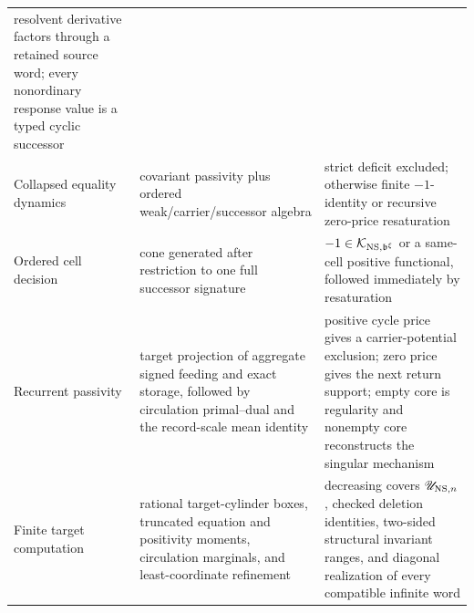 \documentclass[11pt]{article}
\numberwithin{section}{part}
\theoremstyle{plain}
\theoremstyle{definition}
\theoremstyle{remark}
\begin{document}
\begin{center}
\begin{tabular}{p{.27\linewidth}p{.30\linewidth}p{.34\linewidth}}
resolvent derivative factors through a retained source word; every
nonordinary response value is a typed cyclic successor\\
Collapsed equality dynamics & covariant passivity plus ordered
weak/carrier/successor algebra & strict deficit excluded; otherwise finite
\(-1\)-identity or recursive zero-price resaturation\\
Ordered cell decision & cone generated after restriction to one full
successor signature & \(-1\in\mathcal K_{{\rm NS},\mathfrak b^\xi}\) or a
same-cell positive functional, followed immediately by resaturation\\
Recurrent passivity & target projection of aggregate signed feeding and exact
storage, followed by circulation primal--dual and the record-scale mean
identity & positive cycle price gives a carrier-potential exclusion; zero
price gives the next return support; empty core is regularity and nonempty
core reconstructs the singular mechanism\\
Finite target computation & rational target-cylinder boxes, truncated
equation and positivity moments, circulation marginals, and least-coordinate
refinement & decreasing covers \(\mathscr U_{{\rm NS},n}\), checked deletion
identities, two-sided structural invariant ranges, and diagonal realization
of every compatible infinite word\\
\bottomrule
\end{tabular}
\end{center}
\end{document}
